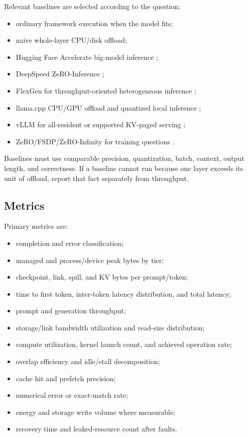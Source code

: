 Relevant baselines are selected according to the question:

\begin{itemize}
  \item ordinary framework execution when the model fits;
  \item naive whole-layer CPU/disk offload;
  \item Hugging Face Accelerate big-model inference \cite{accelerate_big_model};
  \item DeepSpeed ZeRO-Inference \cite{deepspeed_zero_inference};
  \item FlexGen for throughput-oriented heterogeneous inference \cite{sheng2023flexgen};
  \item llama.cpp CPU/GPU offload and quantized local inference \cite{llamacpp};
  \item vLLM for all-resident or supported KV-paged serving \cite{kwon2023pagedattention};
  \item ZeRO/FSDP/ZeRO-Infinity for training questions \cite{rajbhandari2020zero,zhao2023fsdp,rajbhandari2021zeroinfinity}.
\end{itemize}

Baselines must use comparable precision, quantization, batch, context, output length, and correctness. If a baseline cannot run because one layer exceeds its unit of offload, report that fact separately from throughput.

\subsection{Metrics}

Primary metrics are:

\begin{itemize}
  \item completion and error classification;
  \item managed and process/device peak bytes by tier;
  \item checkpoint, link, spill, and KV bytes per prompt/token;
  \item time to first token, inter-token latency distribution, and total latency;
  \item prompt and generation throughput;
  \item storage/link bandwidth utilization and read-size distribution;
  \item compute utilization, kernel launch count, and achieved operation rate;
  \item overlap efficiency and idle/stall decomposition;
  \item cache hit and prefetch precision;
  \item numerical error or exact-match rate;
  \item energy and storage write volume where measurable;
  \item recovery time and leaked-resource count after faults.
\end{itemize}

